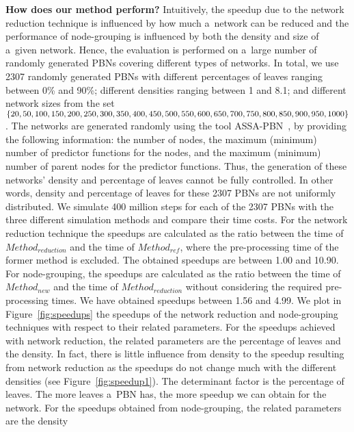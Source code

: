 \documentclass[runningheads,a4paper]{llncs}
\begin{document}
\medskip\noindent\textbf{How does our method perform?}
Intuitively, the speedup due to the network reduction technique is influenced by how much
a~network can be reduced and the performance of node-grouping is influenced by both the density
and size of a~given network.
Hence, the evaluation is performed on a~large number of randomly
generated PBNs covering different types of networks.
In total, we use 2307 randomly generated PBNs with different percentages of leaves ranging between
0\% and 90\%; different densities ranging between 1 and 8.1; and different network sizes from the
set $\{20, 50, 100, 150, 200, 250, 300, 350, \\400, 450, 500, 550, 600, 650, 700, 750, 800, 850,
900, 950, 1000\}$.
The networks are generated randomly using the tool \textsf{ASSA-PBN}~\cite{assa},
by providing the following information: the number of nodes, the maximum (minimum) number of predictor functions for the nodes,
and the maximum (minimum) number of parent nodes for the predictor functions.
Thus, the generation of these networks' density and percentage of leaves cannot be fully controlled.
In other words, density and percentage of leaves for these 2307 PBNs are not uniformly distributed.
We simulate 400 million steps for each of the 2307 PBNs with the three
different simulation methods and compare their time costs. For the network reduction technique
the speedups are calculated as the ratio between the time of {\sf $Method_{reduction}$} and the
time of {\sf $Method_{ref}$}, where the pre-processing time of the former method is excluded. The
obtained speedups are between 1.00 and 10.90. For node-grouping, the speedups are calculated as
the ratio between the time of {\sf $Method_{new}$} and the time of {\sf $Method_{reduction}$}
without considering the required pre-processing times. We have obtained speedups between 1.56 and
4.99. We plot in Figure~\ref{fig:speedups} the speedups of the network reduction and node-grouping
techniques with respect to their related parameters. For the speedups achieved with network
reduction, the related parameters are the percentage of leaves and the density. In fact, there is
little influence from density to the speedup resulting from network reduction as the speedups do
not change much with the different densities (see Figure~\ref{fig:speedup1}). The determinant
factor is the percentage of leaves. The more leaves a~PBN has, the more speedup we can obtain for
the network. For the speedups obtained from node-grouping, the related parameters are the density
\end{document}
